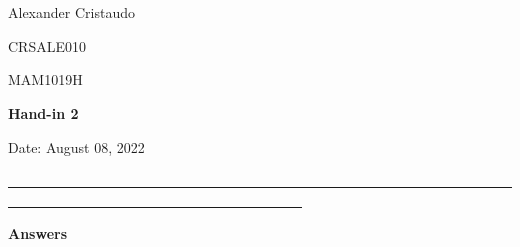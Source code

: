 \documentclass[12pt, a4paper]{exam}
\begin{document}
	\noindent
	\begin{minipage}[l]{0.1\textwidth}
		\noindent
	\end{minipage}
\hfill
\begin{minipage}[c]{1.0\textwidth}
	\begin{center}
		
		{
		\large \ \ \par
		\large \ \ \par
		\large  Alexander Cristaudo \par
		\small	CRSALE010	\par
		\large	MAM1019H	\par
	\large \textbf{Hand-in 2}	\par
\small	Date: August 08, 2022}
	\end{center}
\end{minipage}
\par
\vspace{0.2in}
\noindent
\uline{ \ \ \ \ \ \ \ \ \ \ \ \ \ \ \ \ \ \ \ \ \ \ \ \ \ \ \ \ \ \ \ \ \ \ \ \ \ \ \ \ \ \ \ \ \ \ \ \ \ \ \ \ \ \ \ \ \ \ \ \ \ \ \ \ \ \ \ \ \ \ \ \ \ \ \ \ \ \  \ \ \ \ \ \ \ \ \ \ \ \ \ \  \ \ \ \ \ \ \ \ \ \ \ \ \ \ \ \ \ \ \ \ \ \ }
\par 
\vspace{0.15in}
\noindent
\centering
{\small \bfseries 	Answers }
\end{document}
